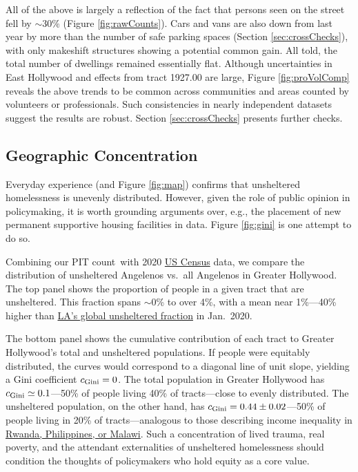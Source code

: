 \documentclass[11pt,twocolumn]{article}
\def\Count{count}
\begin{document}
All of the above is largely a reflection of the fact that persons seen on the street fell by $\sim$30\%
(Figure \ref{fig:rawCounts}). Cars and vans are also down from last year by more than the number of 
safe parking spaces (Section \ref{sec:crossChecks}), with only makeshift structures showing a potential 
common gain. All told, the total number of dwellings remained essentially flat. Although uncertainties 
in East Hollywood and effects from tract 1927.00 are large, Figure \ref{fig:proVolComp} reveals the above 
trends to be common across communities and areas counted by volunteers or professionals. Such consistencies 
in nearly independent datasets suggest the results are robust. Section \ref{sec:crossChecks} presents further 
checks.


\subsection{Geographic Concentration}
\label{sec:concentration}

Everyday experience (and Figure \ref{fig:map}) confirms that unsheltered homelessness is
unevenly distributed. However, given the role of public opinion in policymaking, it is worth 
grounding arguments over, e.g., the placement of new permanent supportive housing facilities 
in data. Figure \ref{fig:gini} is one attempt to do so. 

Combining our PIT \Count\ with 2020 \href{https://geomap.ffiec.gov/FFIECGeocMap/GeocodeMap1.aspx}
{US Census} data, we compare the distribution of unsheltered Angelenos vs.\ all Angelenos in Greater
Hollywood. The top panel shows the proportion of people in a given tract that are unsheltered. This fraction 
spans $\sim$0\% to over 4\%, with a mean near 1\%---40\% higher than 
\href{https://www.lahsa.org/documents?id=4680-2020-greater-los-angeles-homeless-count-city-of-los-angeles}
{LA's global unsheltered fraction} in Jan.~2020.

The bottom panel shows the cumulative contribution of each tract to Greater Hollywood's
total and unsheltered populations. If people were equitably distributed, the curves would 
correspond to a diagonal line of unit slope, yielding a Gini coefficient $c_{\rm Gini}=0$. 
The total population in Greater Hollywood has $c_{\rm Gini}\simeq0.1$---50\% of people 
living 40\% of tracts---close to evenly distributed. The unsheltered population, 
on the other hand, has $c_{\rm Gini}=0.44\pm0.02$---50\% of people living in 20\% of 
tracts---analogous to those describing income inequality in 
\href{https://en.wikipedia.org/wiki/List_of_countries_by_income_equality#UN,_World_Bank_and_CIA_list_\%E2\%80\%93_income_ratios_and_Gini_indices}{Rwanda, Philippines, or Malawi}. Such a concentration 
of lived trauma, real poverty, and the attendant externalities of unsheltered homelessness 
should condition the thoughts of policymakers who hold equity as a core value.
\end{document}
